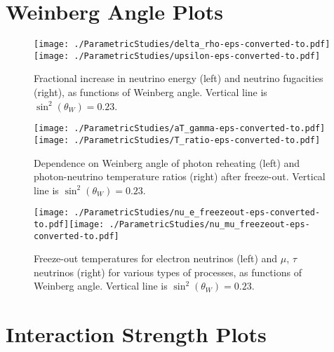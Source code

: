 \begin{subappendices}
\section{Weinberg Angle Plots}\label{app:weinberg}



\begin{figure}[H]
\centerline{\texttt{[image: ./ParametricStudies/delta\_rho-eps-converted-to.pdf]}\hspace{-5mm}\texttt{[image: ./ParametricStudies/upsilon-eps-converted-to.pdf]}}
\caption{Fractional increase in neutrino energy (left) and neutrino fugacities (right), as functions of Weinberg angle. Vertical line is $\sin^2(\theta_W)=0.23$.}
 \end{figure}




\begin{figure}[H]
\centerline{\texttt{[image: ./ParametricStudies/aT\_gamma-eps-converted-to.pdf]}\hspace{-5mm}\texttt{[image: ./ParametricStudies/T\_ratio-eps-converted-to.pdf]}}
\caption{Dependence on Weinberg angle of photon reheating  (left) and photon-neutrino temperature ratios (right) after freeze-out. Vertical line is $\sin^2(\theta_W)=0.23$.}
 \end{figure}



\begin{figure}[H]
\centerline{\texttt{[image: ./ParametricStudies/nu\_e\_freezeout-eps-converted-to.pdf]}\hspace{5mm}\texttt{[image: ./ParametricStudies/nu\_mu\_freezeout-eps-converted-to.pdf]}}
\caption{Freeze-out temperatures for electron neutrinos (left) and $\mu$, $\tau$ neutrinos (right) for various types of processes, as functions of Weinberg angle. Vertical line is $\sin^2(\theta_W)=0.23$.}\label{fig:freezeoutT}
 \end{figure}

\section{Interaction Strength Plots}\label{app:int_strength}




\end{subappendices}
